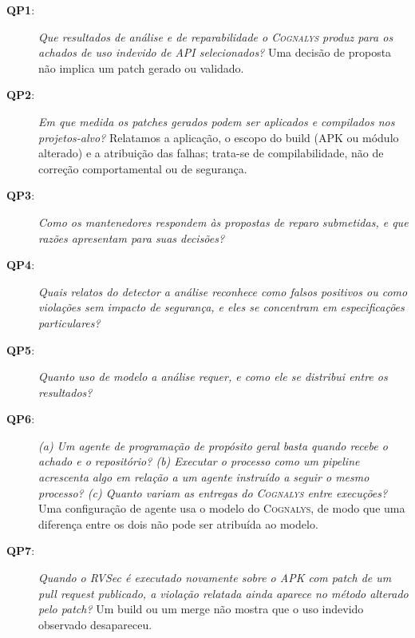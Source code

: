 \documentclass[conference]{IEEEtran}
\newcommand{\system}{\textsc{Cognalys}}
\newcommand{\researchq}[1]{\textbf{QP#1}}
\begin{document}
\begin{description}
  \item[\researchq{1}:] \emph{Que resultados de análise e de reparabilidade
  o {\system} produz para os achados de uso indevido de API selecionados?}
  Uma decisão de proposta não implica um patch gerado ou validado.

\item[\researchq{2}:] \emph{Em que medida os patches gerados podem ser
  aplicados e compilados nos projetos-alvo?}
  Relatamos a aplicação, o escopo do build (APK ou módulo alterado) e a atribuição
  das falhas; trata-se de compilabilidade, não de correção comportamental ou de segurança.

  \item[\researchq{3}:] \emph{Como os mantenedores respondem às propostas de reparo
  submetidas, e que razões apresentam para suas decisões?}

  \item[\researchq{4}:] \emph{Quais relatos do detector a análise
  reconhece como falsos positivos ou como violações sem impacto de segurança,
  e eles se concentram em especificações particulares?}

  \item[\researchq{5}:] \emph{Quanto uso de modelo a análise
  requer, e como ele se distribui entre os resultados?}

\item[\researchq{6}:] \emph{(a) Um agente de programação de propósito geral basta quando
  recebe o achado e o repositório? (b) Executar o processo como um
  pipeline acrescenta algo em relação a um agente instruído a seguir o mesmo processo?
  (c) Quanto variam as entregas do {\system} entre execuções?}
  Uma configuração de agente usa o modelo do {\system}, de modo que uma diferença entre os
  dois não pode ser atribuída ao modelo.

  \item[\researchq{7}:] \emph{Quando o RVSec é executado novamente sobre o APK com patch de um
  pull request publicado, a violação relatada ainda aparece no
  método alterado pelo patch?}
  Um build ou um merge não mostra que o uso indevido observado desapareceu.
\end{description}
\end{document}
